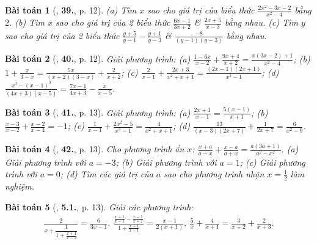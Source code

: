 \documentclass{article}
\numberwithin{equation}{section}
\newtheorem{baitoan}{Bài toán}
\begin{document}
\begin{baitoan}[\cite{SBT_Toan_8_tap_2}, \textbf{39.}, p. 12]
	(a) Tìm $x$ sao cho giá trị của biểu thức $\frac{2x^2 - 3x - 2}{x^2 - 4}$ bằng $2$. (b) Tìm $x$ sao cho giá trị của 2 biểu thức $\frac{6x - 1}{3x + 2}$ \& $\frac{2x + 5}{x - 3}$ bằng nhau. (c) Tìm $y$ sao cho giá trị của 2 biểu thức $\frac{y + 5}{y - 1} - \frac{y + 1}{y - 3}$ \& $\frac{-8}{(y - 1)(y - 3)}$ bằng nhau.
\end{baitoan}

\begin{baitoan}[\cite{SBT_Toan_8_tap_2}, \textbf{40.}, p. 12]
	Giải phương trình: (a) $\frac{1 - 6x}{x - 2} + \frac{9x + 4}{x + 2} = \frac{x(3x - 2) + 1}{x^2 - 4}$; (b) $1 + \frac{x}{3 - x} = \frac{5x}{(x + 2)(3 - x)} + \frac{2}{x + 2}$; (c) $\frac{2}{x - 1} + \frac{2x + 3}{x^2 + x + 1} = \frac{(2x - 1)(2x + 1)}{x^3 - 1}$; (d) $\frac{x^3 - (x - 1)^3}{(4x + 3)(x - 5)} = \frac{7x - 1}{4x + 3} - \frac{x}{x - 5}$.
\end{baitoan}

\begin{baitoan}[\cite{SBT_Toan_8_tap_2}, \textbf{41.}, p. 13]
	Giải phương trình: (a) $\frac{2x + 1}{x - 1} = \frac{5(x - 1)}{x + 1}$; (b) $\frac{x - 3}{x - 2} + \frac{x - 2}{x - 4} = - 1$; (c) $\frac{1}{x - 1} + \frac{2x^2 - 5}{x^3 - 1} = \frac{4}{x^2 + x + 1}$; (d) $\frac{13}{(x - 3)(2x + 7)} + \frac{1}{2x + 7} = \frac{6}{x^2 - 9}$.
\end{baitoan}

\begin{baitoan}[\cite{SBT_Toan_8_tap_2}, \textbf{42.}, p. 13]
	Cho phương trình ẩn $x$: $\frac{x + a}{a - x} + \frac{x - a}{a + x} = \frac{a(3a + 1)}{a^2 - x^2}$. (a) Giải phương trình với $a = -3$; (b) Giải phương trình với $a = 1$; (c) Giải phương trình với $a = 0$; (d) Tìm các giá trị của $a$ sao cho phương trình nhận $x = \frac{1}{2}$ làm nghiệm.
\end{baitoan}

\begin{baitoan}[\cite{SBT_Toan_8_tap_2}, \textbf{5.1.}, p. 13]
	Giải các phương trình:
	\begin{align*}
		\frac{2}{x + \dfrac{1}{1 + \frac{x + 1}{x - 2}}} = \frac{6}{3x - 1},\ \frac{\frac{x + 1}{x - 1} - \frac{x - 1}{x + 1}}{1 + \frac{x + 1}{x - 1}} = \frac{x - 1}{2(x + 1)},\ \frac{5}{x} + \frac{4}{x + 1} = \frac{3}{x + 2} + \frac{2}{x + 3}.
	\end{align*}
\end{baitoan}

\end{document}
